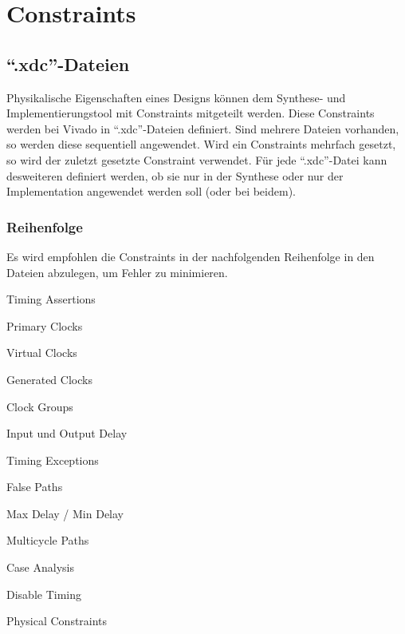 \section{Constraints}
\subsection{``.xdc''-Dateien}
Physikalische Eigenschaften eines Designs können dem Synthese- und Implementierungstool mit Constraints mitgeteilt werden. Diese Constraints werden bei Vivado in ``.xdc''-Dateien definiert. Sind mehrere Dateien vorhanden, so werden diese sequentiell angewendet. Wird ein Constraints mehrfach gesetzt, so wird der zuletzt gesetzte Constraint verwendet. Für jede ``.xdc''-Datei kann desweiteren definiert werden, ob sie nur in der Synthese oder nur der Implementation angewendet werden soll (oder bei beidem).


\subsubsection{Reihenfolge}
Es wird empfohlen die Constraints in der nachfolgenden Reihenfolge in den Dateien abzulegen, um Fehler zu minimieren.
\begin{multicols}{3}
    \begin{compactenum}
        \item Timing Assertions
        \begin{compactenum}
            \item Primary Clocks
            \item Virtual Clocks
            \item Generated Clocks
            \item Clock Groups
            \item Input und Output Delay
        \end{compactenum}
        \item Timing Exceptions
        \begin{compactenum}
            \item False Paths
            \item Max Delay / Min Delay
            \item Multicycle Paths
            \item Case Analysis
            \item Disable Timing
        \end{compactenum}
        \item Physical Constraints \\ \ \\ \ \\ \ \\
    \end{compactenum}
\end{multicols}

